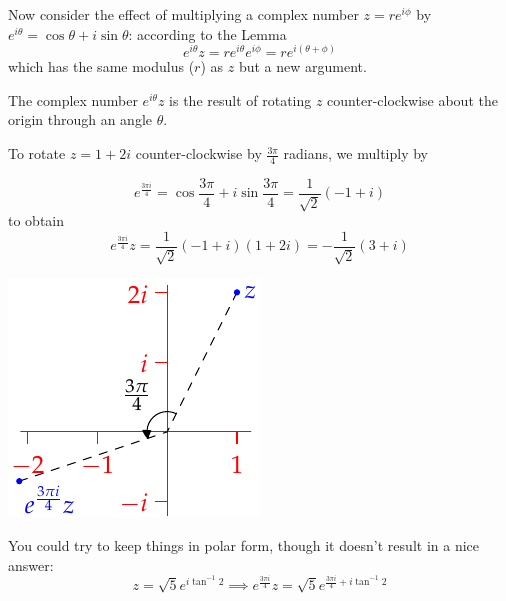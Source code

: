 Now consider the effect of multiplying a complex number $z=re^{i\phi}$ by $e^{i\theta}=\cos\theta+i\sin\theta$: according to the Lemma
\[
	e^{i\theta}z=re^{i\theta}e^{i\phi}=re^{i(\theta+\phi)}
\]
which has the same modulus ($r$) as $z$ but a new argument.

\begin{thm}{}{}
	The complex number $e^{i\theta}z$ is the result of rotating $z$ counter-clockwise about the origin through an angle $\theta$.
\end{thm}

\begin{example}{}{}
	To rotate $z=1+2i$ counter-clockwise by $\frac{3\pi}4$ radians, we multiply by\par
	\begin{minipage}[t]{0.69\linewidth}\vspace{-5pt}
	\[
		e^{\frac{3\pi i}4}=\cos\frac{3\pi}4+i\sin\frac{3\pi}4=\frac 1{\sqrt 2}(-1+i)
	\]
	to obtain
	\[
		e^{\frac{3\pi i}4}z =\frac 1{\sqrt 2}(-1+i)(1+2i)=-\frac 1{\sqrt 2}(3+i)
	\]
	\end{minipage}
	\hfill
	\begin{minipage}[t]{0.3\linewidth}\vspace{-15pt}
		\flushright\includegraphics{complex-rotate}
	\end{minipage}\medbreak
	You could try to keep things in polar form, though it doesn't result in a nice answer:
	\[
		z=\sqrt 5e^{i\tan^{-1}2}\implies e^{\frac{3\pi i}4}z=\sqrt 5e^{\frac{3\pi i}4+i\tan^{-1}2}
	\]
\end{example}




